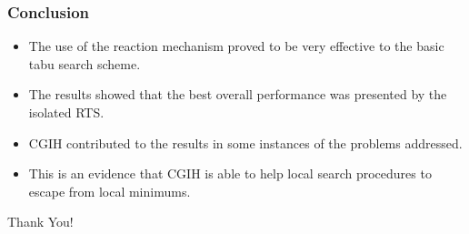 \documentclass{beamer}
\begin{document}
\begin{frame}
  \frametitle{Conclusion}
{
	
\begin{itemize}
	\item<1-> The use of the reaction mechanism proved to be very effective to the basic tabu search scheme.
	\item<2-> The results showed that the best overall performance was presented by the isolated RTS.
	\item<3-> CGIH contributed to the results in some instances of the problems addressed.
	\item<4-> This is an evidence that CGIH is able to help local search procedures to escape from local minimums. 
\end{itemize}

}
\end{frame}

\begin{frame}
{
	
\begin{center}
	{\LARGE Thank You!}
\end{center}

}
\end{frame}
\end{document}
